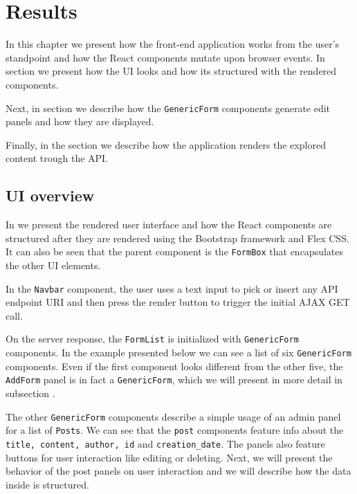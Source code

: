 \chapter{Results}
\label{chapter:results}

In this chapter we present how the front-end application works from the user's standpoint and how the React components mutate upon browser events. In section  we present how the UI looks and how its structured with the rendered components.

Next, in section  we describe how the \texttt{GenericForm} components generate edit panels and how they are displayed.

Finally, in the  section we describe how the application renders the explored content trough the API.

\section{UI overview}
\label{sec:ui-overview}

In  we present the rendered user interface and how the React components are structured after they are rendered using the Bootstrap framework and Flex CSS. It can also be seen that the parent component is the \texttt{FormBox} that encapsulates the other UI elements.

In the \texttt{Navbar} component, the user uses a text input to pick or insert any API endpoint URI and then press the render button to trigger the initial AJAX GET call. 

On the server response, the \texttt{FormList} is initialized with \texttt{GenericForm} components. In the example presented below we can see a list of six \texttt{GenericForm} components. Even if the first component looks different from the other five, the \texttt{AddForm} panel is in fact a \texttt{GenericForm}, which we will present in more detail in subsection .

The other \texttt{GenericForm} components describe a simple usage of an admin panel for a list of \texttt{Posts}. We can see that the \texttt{post} components feature info about the \texttt{title, content, author, id} and \texttt{creation\_date}. The panels also feature buttons for user interaction like editing or deleting. Next, we will present the behavior of the post panels on user interaction and we will describe how the data inside is structured.

